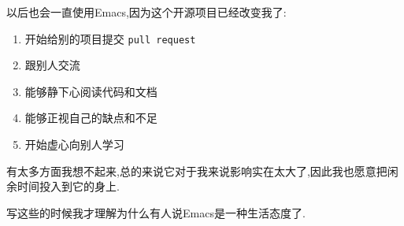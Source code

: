 \documentclass[11pt]{article}
\begin{document}
\begin{itemize}
以后也会一直使用Emacs,因为这个开源项目已经改变我了:

\begin{enumerate}
\item 开始给别的项目提交 \texttt{pull request}

\item 跟别人交流

\item 能够静下心阅读代码和文档

\item 能够正视自己的缺点和不足

\item 开始虚心向别人学习
\end{enumerate}

有太多方面我想不起来,总的来说它对于我来说影响实在太大了,因此我也愿意把闲余时间投入到它的身上.

写这些的时候我才理解为什么有人说Emacs是一种生活态度了.
\end{itemize}
\end{document}
